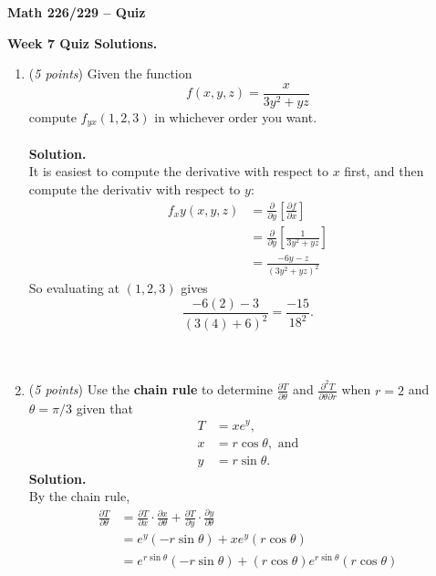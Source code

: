 \documentclass[12 pt]{article}
\begin{document}
	\begin{center}
		\textbf{\hfill Math 226/229 -- Quiz} \\
	\end{center}
	\medskip

	\noindent
	\textbf{Week 7 Quiz Solutions.} \hfill
	\vspace{.1in}
	\hspace*{0.2in}
	\medskip
	\noindent
  \begin{enumerate}
		\item (\textit{5 points})
		Given the function \[
			f(x, y, z) = \frac{x}{3y^2 + yz}
		\] compute $f_{yx} (1, 2, 3)$ in whichever order you want.
    \\~\\
    \textbf{Solution.}
    \\
		It is easiest to compute the derivative with respect to $x$ first,
		and then compute the derivativ with respect to $y$: \begin{align*}
		f_xy(x, y, z) &= \frac{\partial}{\partial y}\left[
			\frac{\partial f}{\partial x}
		\right] \\
		&= \frac{\partial}{\partial y}\left[
			\frac{1}{3y^2 + yz}
		\right] \\
		&= \frac{-6y - z}{(3y^2 + yz)^2}
		\end{align*}
		So evaluating at $(1, 2, 3)$ gives \[
			\frac{-6(2) - 3}{(3(4) + 6)^2} = \frac{-15}{18^2}.
		\]
		\\~\\
		\item (\textit{5 points})
		Use the \textbf{chain rule} to determine
		$\displaystyle \frac{\partial T}{\partial \theta}$ and
		$\displaystyle \frac{\partial^2 T}{\partial \theta \partial r}$
		when $r = 2$ and $\theta = \pi/3$
		given that \begin{align*}
			T &= xe^y, \\
			x &= r\cos\theta, \text{ and}\\
			y &= r\sin\theta.
		\end{align*}
    \textbf{Solution.}
		\\
		By the chain rule, \begin{align*}
			\frac{\partial T}{\partial \theta}
			&= \frac{\partial T}{\partial x}\cdot\frac{\partial x}{\partial \theta}
			+ \frac{\partial T}{\partial y}\cdot\frac{\partial y}{\partial \theta}\\
			&= e^y(-r \sin\theta) + xe^y(r\cos\theta) \\
			&= e^{r \sin\theta}(-r \sin\theta) + (r\cos\theta)e^{r\sin\theta}(r\cos\theta) \\

\end{align*}
\end{enumerate}
\end{document}
